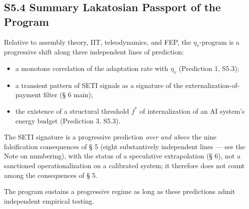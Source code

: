 \documentclass[pdflatex,sn-mathphys-ay]{sn-jnl}
\providecommand{\tightlist}{\setlength{\itemsep}{0pt}\setlength{\parskip}{0pt}}
\begin{document}
\subsection*{S5.4 Summary Lakatosian Passport of the Program}\label{s5.4-summary-lakatosian-passport-of-the-program}

Relative to assembly theory, IIT, teleodynamics, and FEP, the \(\eta_v\)-program is a progressive shift along three independent lines of prediction:

\begin{itemize}
\tightlist
\item
  a monotone correlation of the adaptation rate with \(\eta_v\) (Prediction 1, S5.3);
\item
  a transient pattern of SETI signals as a signature of the externalization-of-payment filter (§ 6 main);
\item
  the existence of a structural threshold \(f^*\) of internalization of an AI system's energy budget (Prediction 3, S5.3).
\end{itemize}

The SETI signature is a progressive prediction \emph{over and above} the nine falsification consequences of § 5 (eight substantively independent lines --- see the Note on numbering), with the status of a speculative extrapolation (§ 6), not a sanctioned operationalization on a calibrated system; it therefore does not count among the consequences of § 5.

The program sustains a progressive regime as long as these predictions admit independent empirical testing.


\nocite{*}

\end{document}
